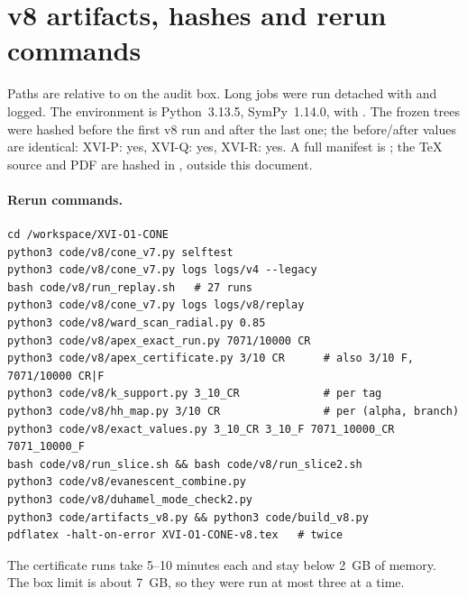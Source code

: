 
\section{v8 artifacts, hashes and rerun commands}
\label{app:v8artifacts}

Paths are relative to  on the audit box.
Long jobs were run detached with  and logged. The
environment is Python~3.13.5, SymPy~1.14.0, with .
The frozen trees were hashed before the first v8 run and after the last
one; the before/after values are identical: XVI-P: yes, XVI-Q: yes, XVI-R: yes.
A full manifest is ; the
\TeX{} source and PDF are hashed in , outside this
document.

\paragraph{Rerun commands.}
\begin{verbatim}
cd /workspace/XVI-O1-CONE
python3 code/v8/cone_v7.py selftest
python3 code/v8/cone_v7.py logs logs/v4 --legacy
bash code/v8/run_replay.sh   # 27 runs
python3 code/v8/cone_v7.py logs logs/v8/replay
python3 code/v8/ward_scan_radial.py 0.85
python3 code/v8/apex_exact_run.py 7071/10000 CR
python3 code/v8/apex_certificate.py 3/10 CR      # also 3/10 F, 7071/10000 CR|F
python3 code/v8/k_support.py 3_10_CR             # per tag
python3 code/v8/hh_map.py 3/10 CR                # per (alpha, branch)
python3 code/v8/exact_values.py 3_10_CR 3_10_F 7071_10000_CR 7071_10000_F
bash code/v8/run_slice.sh && bash code/v8/run_slice2.sh
python3 code/v8/evanescent_combine.py
python3 code/v8/duhamel_mode_check2.py
python3 code/artifacts_v8.py && python3 code/build_v8.py
pdflatex -halt-on-error XVI-O1-CONE-v8.tex   # twice
\end{verbatim}
The certificate runs take 5--10 minutes each and stay below 2~GB of
memory. The box limit is about 7~GB, so they were run at most three
at a time.

